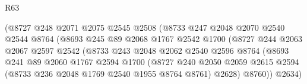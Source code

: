\begin{lexlean}{R63}
\begin{coremodule}
                                      (@8727
                                        @248
                                        @2071
                                        @2075
                                        @2545
                                        @2508
                                        (@8733
                                          @247
                                          @2048
                                          @2070
                                          @2540
                                          @2544
                                          @8764
                                          (@8693
                                            @245
                                            @89
                                            @2068
                                            @1767
                                            @2542
                                            @1700
                                            (@8727
                                              @244
                                              @2063
                                              @2067
                                              @2597
                                              @2542
                                              (@8733
                                                @243
                                                @2048
                                                @2062
                                                @2540
                                                @2596
                                                @8764
                                                (@8693
                                                  @241
                                                  @89
                                                  @2060
                                                  @1767
                                                  @2594
                                                  @1700
                                                  (@8727
                                                    @240
                                                    @2050
                                                    @2059
                                                    @2615
                                                    @2594
                                                    (@8733 @236 @2048 @1769 @2540 @1955 @8764 @8761)
                                                    @2628)
                                                  @8760))
                                              @2634)

\end{coremodule}
\end{lexlean}
